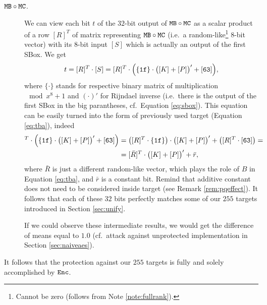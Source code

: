 \begin{description}
	\item[$\texttt{MB}\circ\texttt{MC}$.] We can view each bit $t$ of the $32$-bit output of $\texttt{MB}\circ\texttt{MC}$ as a scalar product of a row $[R]^T$ of matrix representing $\texttt{MB}\circ\texttt{MC}$ (i.e.\ a random-like\footnote{Cannot be zero (follows from Note \ref{note:fullrank}).} $8$-bit vector) with its $8$-bit input $[S]$ which is actually an output of the first SBox. We get
	\begin{equation}
		t = [R]^T\cdot [S] = [R]^T\cdot\Bigl( \{\texttt{1f}\}\cdot\bigl([K]+[P]\bigr)' + [\texttt{63}] \Bigr) ,
	\end{equation}
	where $\{\cdot\}$ stands for respective binary matrix of multiplication$\mod{x^8+1}$ and $(\cdot)'$ for Rijndael inverse (i.e.\ there is the output of the first SBox in the big parantheses, cf.\ Equation \ref{eq:sbox}). This equation can be easily turned into the form of previously used target (Equation \ref{eq:tba}), indeed
	\begin{align*}
		[R]^T\cdot\Bigl( \{\texttt{1f}\}\cdot\bigl([K]+[P]\bigr)' + [\texttt{63}] \Bigr) &= \bigl([R]^T\cdot \{\texttt{1f}\}\bigr)\cdot\bigl([K]+[P]\bigr)' + \bigl([R]^T\cdot [\texttt{63}]\bigr) = \\
		&= [\bar R]^T \cdot \bigl([K]+[P]\bigr)' + \bar r ,
	\end{align*}
	where $\bar R$ is just a different random-like vector, which plays the role of $B$ in Equation \ref{eq:tba}, and $\bar r$ is a constant bit. Remind that additive constant does not need to be considered inside target (see Remark \ref{rem:pqeffect}). It follows that each of these $32$ bits perfectly matches some of our $255$ targets introduced in Section \ref{sec:unify}.
	
	If we could observe these intermediate results, we would get the difference of means equal to $1.0$ (cf.\ attack against unprotected implementation in Section \ref{sec:naiveaes}).
\end{description}
\begin{remark}
\label{rem:enc}
	It follows that the protection against our $255$ targets is fully and solely accomplished by $\texttt{Enc}$.
\end{remark}
